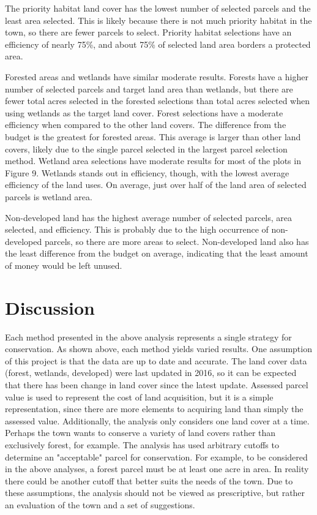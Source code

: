 \documentclass[12pt, stu, floatsintext,table]{apa7}
\begin{document}
The priority habitat land cover has the lowest number of selected parcels and the least area selected. This is likely because there is not much priority habitat in the town, so there are fewer parcels to select. Priority habitat selections have an efficiency of nearly 75\%, and about 75\% of selected land area borders a protected area. 

Forested areas and wetlands have similar moderate results. Forests have a higher number of selected parcels and target land area than wetlands, but there are fewer total acres selected in the forested selections than total acres selected when using wetlands as the target land cover. Forest selections have a moderate efficiency when compared to the other land covers. The difference from the budget is the greatest for forested areas. This average is larger than other land covers, likely due to the single parcel selected in the largest parcel selection method. Wetland area selections have moderate results for most of the plots in Figure 9. Wetlands stands out in efficiency, though, with the lowest average efficiency of the land uses. On average, just over half of the land area of selected parcels is wetland area. 

Non-developed land has the highest average number of selected parcels, area selected, and efficiency. This is probably due to the high occurrence of non-developed parcels, so there are more areas to select. Non-developed land also has the least difference from the budget on average, indicating that the least amount of money would be left unused. 
\section{Discussion}
Each method presented in the above analysis represents a single strategy for conservation. As shown above, each method yields varied results. One assumption of this project is that the data are up to date and accurate. The land cover data (forest, wetlands, developed) were last updated in 2016, so it can be expected that there has been change in land cover since the latest update. Assessed parcel value is used to represent the cost of land acquisition, but it is a simple representation, since there are more elements to acquiring land than simply the assessed value. Additionally, the analysis only considers one land cover at a time. Perhaps the town wants to conserve a variety of land covers rather than exclusively forest, for example. The analysis has used arbitrary cutoffs to determine an "acceptable" parcel for conservation. For example, to be considered in the above analyses, a forest parcel must be at least one acre in area. In reality there could be another cutoff that better suits the needs of the town. Due to these assumptions, the analysis should not be viewed as prescriptive, but rather an evaluation of the town and a set of suggestions.     
\end{document}
